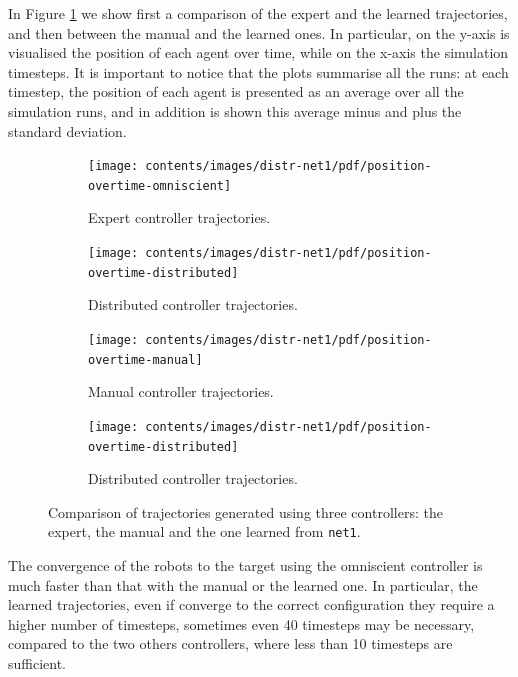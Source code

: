 In Figure \ref{fig:net1traj} we show first a comparison of the expert and the 
learned trajectories, and then between the manual and the learned ones. In 
particular, on the y-axis is visualised the position of each agent over time, while 
on the x-axis the simulation timesteps. It is important to notice that the plots 
summarise all the runs: at each timestep, the position of each agent is presented 
as an average over all the simulation runs, and in addition is  shown this average 
minus and plus the standard deviation.
\begin{figure}[!htb]
	\centering
	\begin{subfigure}[h]{0.49\textwidth}
		\centering
		\texttt{[image: contents/images/distr-net1/pdf/position-overtime-omniscient]}%
		\caption{Expert controller trajectories.}
	\end{subfigure}
	\hfill
	\begin{subfigure}[h]{0.49\textwidth}
		\centering
		\texttt{[image: contents/images/distr-net1/pdf/position-overtime-distributed]}
		\caption{Distributed controller trajectories.}
	\end{subfigure}
	\hspace*{\fill}%
	
	\vspace*{8pt}%
	
	\hspace*{\fill}%
	\begin{subfigure}[h]{0.49\textwidth}
		\centering
		\texttt{[image: contents/images/distr-net1/pdf/position-overtime-manual]}%
		\caption{Manual controller trajectories.}
	\end{subfigure}
	\hfill
	\begin{subfigure}[h]{0.49\textwidth}
		\centering
		\texttt{[image: contents/images/distr-net1/pdf/position-overtime-distributed]}
		\caption{Distributed controller trajectories.}
	\end{subfigure}
	\caption[Evaluation of the trajectories learned by \texttt{net1}.]{Comparison 
		of trajectories generated using three controllers: the expert, the manual and 
		the one learned from \texttt{net1}.}
	\label{fig:net1traj}
\end{figure}

The convergence of the robots to the target using the omniscient controller is 
much faster than that with the manual or the learned one. In particular, the 
learned trajectories, even if converge to the correct configuration they require a 
higher number of timesteps, sometimes even 40 timesteps may be necessary, 
compared to the two others controllers, where less than 10 timesteps are 
sufficient.

